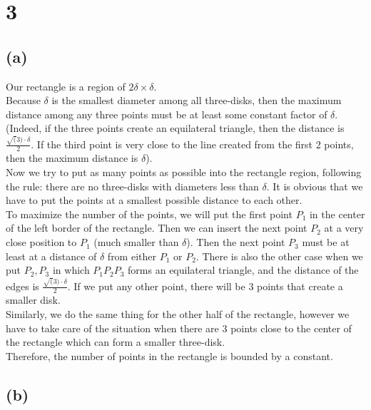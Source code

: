 
\section*{3}
\subsection*{(a)}
Our rectangle is a region of $2 \delta \times \delta$. \\

Because $\delta$ is the smallest diameter among all three-disks, then the maximum distance among any three points must be at least some constant factor of $\delta$. (Indeed, if the three points create an equilateral triangle, then the distance is 
$\frac{\sqrt(3) \cdot \delta} {2}$. If the third point is very close to the line created from the first 2 points, then the maximum distance is $\delta$).\\

Now we try to put as many points as possible into the rectangle region, following the rule: there are no three-disks with diameters less than $\delta$. It is obvious that we have to put the points at a smallest possible distance to each other. \\

To maximize the number of the points, we will put the first point $P_1$ in the center of the left border of the rectangle. Then we can insert the next point $P_2$ at a very close position to $P_1$ (much smaller than $\delta$). Then the next point $P_3$ must be at least at a distance of $\delta$ from either $P_1$ or $P_2$. There is also the other case when we put $P_2, P_3$ in which $P_1P_2P_3$ forms an equilateral triangle, and the distance of the edges is $\frac{\sqrt(3) \cdot \delta} {2}$. If we put any other point, there will be 3 points that create a smaller disk. \\

Similarly, we do the same thing for the other half of the rectangle, however we have to take care of the situation when there are 3 points close to the center of the rectangle which can form a smaller three-disk. \\

Therefore, the number of points in the rectangle is bounded by a constant.

\subsection*{(b)}

